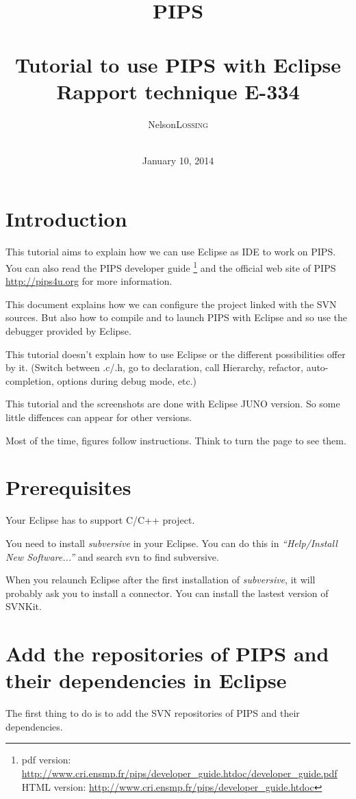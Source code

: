 \documentclass[a4paper]{article}
\title{{\Huge PIPS} \\ ~ \\ Tutorial to use PIPS with Eclipse \\ \normalsize{Rapport technique E-334}}
\author{
\begin{tabular}{rl}
  Nelson & \textsc{Lossing}
\end{tabular}\\
}
\date{January 10, 2014}
\newcommand{\LINK}[1]{\url{#1}\xspace}
\newcommand{\PipsNewWWW}{\LINK{http://pips4u.org}\xspace}
\newcommand{\PipsDevGuidePDF}{\LINK{http://www.cri.ensmp.fr/pips/developer_guide.htdoc/developer_guide.pdf}}
\newcommand{\PipsDevGuideHTDOC}{\LINK{http://www.cri.ensmp.fr/pips/developer_guide.htdoc}}
\begin{document}
\maketitle

\clearpage
\tableofcontents

\newpage

\section{Introduction}

This tutorial aims to explain how we can use Eclipse as IDE to work on PIPS. 
You can also read the PIPS developer guide 
\footnote{pdf version: \PipsDevGuidePDF \\ HTML version: \PipsDevGuideHTDOC} and 
the official web site of PIPS \PipsNewWWW for more information.

This document explains how we can configure the project linked with the SVN sources.
But also how to compile and to launch PIPS with Eclipse and so use the debugger provided by Eclipse.

This tutorial doesn't explain how to use Eclipse or the different possibilities offer by it.
(Switch between .c/.h, go to declaration, call Hierarchy, refactor, auto-completion, options during debug mode, etc.)

This tutorial and the screenshots are done with Eclipse JUNO version. 
So some little diffences can appear for other versions.

Most of the time, figures follow instructions. Think to turn the page to see them.


\section{Prerequisites}

Your Eclipse has to support C/C++ project.

You need to install \emph{subversive} in your Eclipse.
You can do this in \emph{``Help/Install New Software...''} and search svn to find subversive.

When you relaunch Eclipse after the first installation of \emph{subversive}, 
it will probably ask you to install a connector. You can install the lastest version of SVNKit.%


\section{Add the repositories of PIPS and their dependencies in Eclipse}
\label{sec:addSVNrepo}
The first thing to do is to add the SVN repositories of PIPS and their dependencies.
\end{document}
